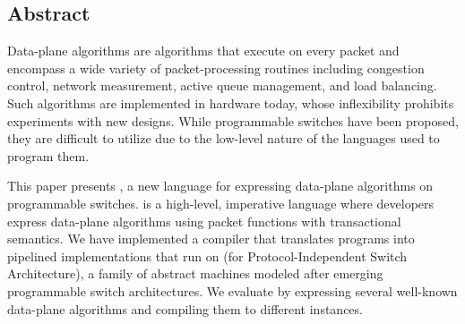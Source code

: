 \subsection*{Abstract}

Data-plane algorithms are algorithms that execute on every packet and encompass
a wide variety of packet-processing routines including congestion control,
network measurement, active queue management, and load balancing. Such 
algorithms are implemented in hardware today, whose inflexibility prohibits
experiments with new designs. While programmable switches have been proposed, 
they are difficult to utilize due to the low-level nature of the languages
used to program them.

This paper presents \pktlanguage, a new language for expressing data-plane
algorithms on programmable switches. \pktlanguage is a high-level, imperative
language where developers express data-plane algorithms using packet functions
with transactional semantics. We have implemented a compiler that translates
\pktlanguage programs into pipelined implementations that run on \absmachine (for
Protocol-Independent Switch Architecture), a
family of abstract machines modeled after emerging programmable switch
architectures. We evaluate \pktlanguage by expressing several well-known
data-plane algorithms and compiling them to different \absmachine instances.
